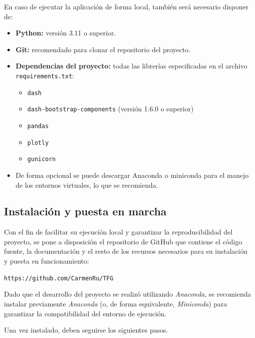 En caso de ejecutar la aplicación de forma local, también será necesario disponer de:

\begin{itemize}
    \item \textbf{Python:} versión 3.11 o superior.
    \item \textbf{Git:} recomendado para clonar el repositorio del proyecto.
    \item \textbf{Dependencias del proyecto:} todas las librerías especificadas en el archivo \texttt{requirements.txt}:
    \begin{itemize}
        \item \texttt{dash}
        \item \texttt{dash-bootstrap-components} (versión 1.6.0 o superior)
        \item \texttt{pandas}
        \item \texttt{plotly}
        \item \texttt{gunicorn}
    \end{itemize}
    \item De forma opcional se puede descargar Anaconda o miniconda para el manejo de los entornos virtuales, lo que se recomienda.
\end{itemize}

\subsection*{Instalación y puesta en marcha}
Con el fin de facilitar su ejecución local y garantizar la reproducibilidad del proyecto, se pone a disposición el repositorio de GitHub que contiene el código fuente, la documentación y el resto de los recursos necesarios para su instalación y puesta en funcionamiento:
\begin{center}
\texttt{https://github.com/CarmenRu/TFG}
\end{center}

Dado que el desarrollo del proyecto se realizó utilizando \textit{Anaconda}, se recomienda instalar previamente \textit{Anaconda} (o, de forma equivalente, \textit{Miniconda}) para garantizar la compatibilidad del entorno de ejecución.

Una vez instalado, deben seguirse los siguientes pasos.

